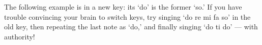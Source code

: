 \documentclass{sight}
\begin{document}
\pagebreak[3]\par
\vspace{5mm}\begin{samepage}The following example is in a new key: its `do' is the former `so.' If you have trouble convincing your brain to switch keys, try singing `do re mi fa so' in the old key, then repeating the last note as `do,' and finally singing `do ti do' --- with authority!\\


\pagebreak[3]\par
{}%
\label{tune:31}%
{%
\parindent 0pt
\noindent
\ifx\preLilyPondExample \undefined
\else
  \expandafter\preLilyPondExample
\fi
\def\lilypondbook{}%

\ifx\postLilyPondExample \undefined
\else
  \expandafter\postLilyPondExample
\fi
}
\end{samepage}


\pagebreak[3]\par
\vspace{5mm}\begin{samepage}
%
\label{tune:32}%
{%
\parindent 0pt
\noindent
\ifx\preLilyPondExample \undefined
\else
  \expandafter\preLilyPondExample
\fi
\def\lilypondbook{}%

\ifx\postLilyPondExample \undefined
\else
  \expandafter\postLilyPondExample
\fi
}
\end{samepage}


\pagebreak[3]\par
\vspace{5mm}\begin{samepage}
%
\label{tune:33}%
{%
\parindent 0pt
\noindent
\ifx\preLilyPondExample \undefined
\else
  \expandafter\preLilyPondExample
\fi
\def\lilypondbook{}%

\ifx\postLilyPondExample \undefined
\else
  \expandafter\postLilyPondExample
\fi
}
\end{samepage}
\end{document}
